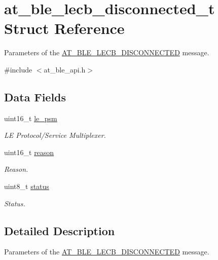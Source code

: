 \hypertarget{structat__ble__lecb__disconnected__t}{}\section{at\+\_\+ble\+\_\+lecb\+\_\+disconnected\+\_\+t Struct Reference}
\label{structat__ble__lecb__disconnected__t}


Parameters of the \mbox{\hyperlink{at__ble__api_8h_a3324640b95f33169515f89738ed5baebafa8c8d306855633521ea3dba779d2622}{A\+T\+\_\+\+B\+L\+E\+\_\+\+L\+E\+C\+B\+\_\+\+D\+I\+S\+C\+O\+N\+N\+E\+C\+T\+ED}} message.  




{\ttfamily \#include $<$at\+\_\+ble\+\_\+api.\+h$>$}

\subsection*{Data Fields}
\begin{DoxyCompactItemize}
\item 
uint16\+\_\+t \mbox{\hyperlink{structat__ble__lecb__disconnected__t_a2dad6ef37aefd9fc94375d265be0c7c9}{le\+\_\+psm}}
\begin{DoxyCompactList}\small\item\em LE Protocol/\+Service Multiplexer. \end{DoxyCompactList}\item 
uint16\+\_\+t \mbox{\hyperlink{structat__ble__lecb__disconnected__t_a54dae37337ee6f6b5e7ca2520987bcb2}{reason}}
\begin{DoxyCompactList}\small\item\em Reason. \end{DoxyCompactList}\item 
uint8\+\_\+t \mbox{\hyperlink{structat__ble__lecb__disconnected__t_ade818037fd6c985038ff29656089758d}{status}}
\begin{DoxyCompactList}\small\item\em Status. \end{DoxyCompactList}\end{DoxyCompactItemize}


\subsection{Detailed Description}
Parameters of the \mbox{\hyperlink{at__ble__api_8h_a3324640b95f33169515f89738ed5baebafa8c8d306855633521ea3dba779d2622}{A\+T\+\_\+\+B\+L\+E\+\_\+\+L\+E\+C\+B\+\_\+\+D\+I\+S\+C\+O\+N\+N\+E\+C\+T\+ED}} message. 

